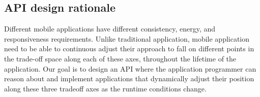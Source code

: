 \subsection{API design rationale}
Different mobile applications have different consistency, energy, and responsiveness requirements.  Unlike traditional application, mobile application
need to be able to continuous adjust their approach to fall on different points in the trade-off space along each of these axes,
throughout the lifetime of the application.  Our goal is to design an API where the application programmer can reason about and 
implement applications that dynamically adjust their position along these three tradeoff axes as the runtime conditions change.

